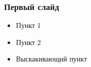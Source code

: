 \begin{frame}\frametitle{Первый слайд}
    \begin{itemize}
        \item Пункт 1
        \item Пункт 2
        \pause
        \item Выскакивающий пункт
    \end{itemize}
\end{frame}
